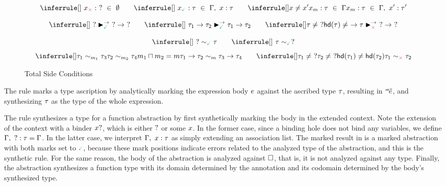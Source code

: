 \begin{figure}
    \centering

    \judgbox{\inCtx{\VV}{\TV}{\MV}{\ctx}}
    \vspace{-7pt}
    \[
    \inCtxEmpty\hspace{20pt}\inCtxFound\hspace{20pt}\inCtxSkip
    \]


    \judgbox{\matchedArrow{\TV}{\TV}{\TV}{\MV}}
    \vspace{-7pt}
    \[
\matchedArrowHole\hspace{20pt}\matchedArrowArrow\hspace{20pt}\matchedArrowOther
    \]


    \judgbox{\consistent{\TV}{\TV}{\MV}}
    \vspace{-10pt}
    \[
    \consistentHoleL\hspace{20pt}\consistentHoleR
    \]
    \[
    \consistentArrow\hspace{20pt}\consistentOther
    \]
    \caption{Total Side Conditions}
    \label{fig:side-conditions}
\end{figure}

The  rule marks a type ascription by analytically marking the expression body $e$ against the ascribed type $\tau$, resulting in $\MELV$, and synthesizing $\tau$ as the type of the whole expression. 

The  rule synthesizes a type for a function abstraction by first synthetically marking the body in the extended context. Note the extension of the context with a binder $x?$, which is either $?$ or some $x$. In the former case, since a binding hole does not bind any variables, we define $\Gamma , ~? : \tau=\Gamma$. In the latter case, we interpret $\Gamma , ~x : \tau$ as simply extending an association list. The marked result in  is a marked abstraction with both marks set to $\MGood$, because these mark positions indicate errors related to the analyzed type of the abstraction, and this is the synthetic rule. For the same reason, the body of the abstraction is analyzed against $\square$, that is, it is not analyzed against any type. Finally, the abstraction synthesizes a function type with its domain determined by the annotation and its codomain determined by the body's synthesized type.

